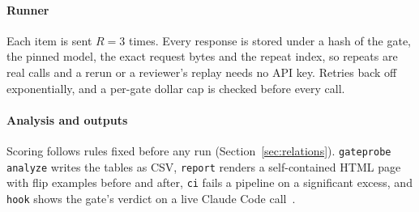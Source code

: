 \paragraph{Runner} Each item is sent $R=3$ times. Every response is stored
under a hash of the gate, the pinned model, the exact request bytes and the
repeat index, so repeats are real calls and a rerun or a reviewer's replay
needs no API key. Retries back off exponentially, and a per-gate dollar cap is
checked before every call.

\paragraph{Analysis and outputs} Scoring follows rules fixed before any run
(Section~\ref{sec:relations}). \texttt{gateprobe analyze} writes the tables as
CSV, \texttt{report} renders a self-contained HTML page with flip examples
before and after, \texttt{ci} fails a pipeline on a significant excess, and
\texttt{hook} shows the gate's verdict on a live Claude Code
call~\cite{anthropic2026hooks}.
